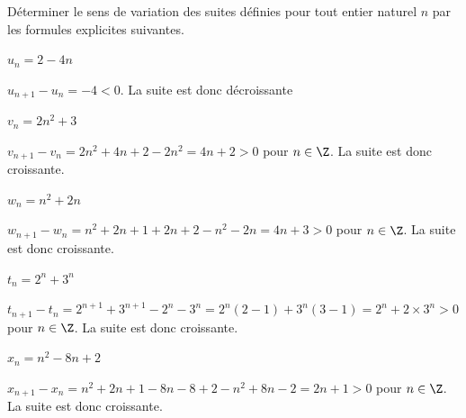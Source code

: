 \documentclass[12pt,a4paper]{article}  %
\begin{document}
Déterminer le sens de variation des suites définies pour tout entier naturel $n$ par les formules explicites suivantes.
\begin{enumMet}
    \item $u_{n}=2-4 n$\\
    \begin{corrBox}
        $u_{n+1}-u_n=-4<0$. La suite est donc décroissante \quad{}
    \end{corrBox}
    \item $v_{n}=2 n^{2}+3$\\
    \begin{corrBox}
        $v_{n+1}-v_n=2n^2+4n+2-2n^2=4n+2>0$ pour $n \in \Z$. La suite est donc croissante. \quad{}
    \end{corrBox}
    \item $w_{n}=n^{2}+2 n$\\
    \begin{corrBox}
        $w_{n+1}-w_n=n^2+2n+1+2n+2-n^2-2n=4n+3>0$ pour $n \in \Z$. La suite est donc croissante. \quad{}
    \end{corrBox}
    \item $t_{n}=2^{n}+3^{n}$\\
    \begin{corrBox}
        $t_{n+1}-t_n=2^{n+1}+3^{n+1}-2^n-3^n=2^n(2-1)+3^n(3-1)=2^n+2\times3^n>0$ pour $n \in \Z$. La suite est donc croissante. \quad{}
    \end{corrBox}
    \item $x_{n}=n^{2}-8 n+2$\\
    \begin{corrBox}
        $x_{n+1}-x_n=n^2+2n+1-8n-8+2-n^2+8n-2=2n+1>0$ pour $n \in \Z$. La suite est donc croissante. \quad{}
    \end{corrBox}
\end{enumMet}
\end{document}
